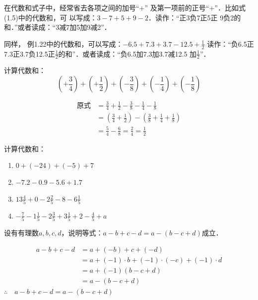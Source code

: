 在代数和式子中，经常省去各项之间的加号“$+$”
及第一项前的正号“$+$”．比如式(1.5)中的代数和，可
以写成：$3-7+5+9-2$．读作：“正3负7正5正
9负2的和．”或者读成：“3减7加5加9减2”．

同样，
例1.22中的代数和，可以写成：$-6.5+7.3+3.7-12.5+\frac{1}{2}$
读作：“负6.5正7.3正3.7负12.5正$\frac{1}{2}$的和”．或者读成：“负6.5加7.3加3.7减12.5
加$\frac{1}{2}$”．




\begin{example}
	计算代数和：
	\[\left(+\frac{3}{4}\right)+\left(+\frac{1}{2}\right)+\left(-\frac{3}{8}\right)+\left(-\frac{1}{4}\right)+\left(-\frac{1}{8}\right)  \]   
\end{example}


\begin{solution}
	\begin{align*}
	\text{原式}&=\frac{3}{4}+\frac{1}{2}-\frac{3}{8}-\frac{1}{4}-\frac{1}{8}  \tag{简化代数和}\\
	&=\left(\frac{3}{4}+\frac{1}{2}\right)-\left(\frac{3}{8}+\frac{1}{4}+\frac{1}{8}\right)\\
	&=\frac{5}{4}-\frac{6}{8}=\frac{2}{4}=\frac{1}{2}
	\end{align*}  
\end{solution}

\begin{ex}
	计算代数和：
	\begin{enumerate}
		\item $0+(-24)+(-5)+7$
		\item $-7.2-0.9-5.6+1.7$
		\item $13\frac{4}{5}+0-2\frac{2}{5}-8-6\frac{1}{5}$
		\item $-\frac{7}{5}-1\frac{1}{5}-2\frac{3}{5}+3\frac{1}{5}+2-\frac{4}{5}+a$
	\end{enumerate} 
\end{ex}

\begin{example}
	设有有理数$a,b,c,d$，说明等式：$a-b+c-d=a-(b-c+d)$成立．
\end{example}

\begin{solution}
	\begin{align*}
	a-b+c-d&= a+(-b)+c+(-d) \tag{代数和原意}\\
	&=a+ (-1)\cdot b+(-1)\cdot (-c)+(-1)\cdot d  \tag{相反数意义}\\
	&=a+(-1)(b-c+d) \tag{分配律}\\
	&=a-(b-c+d)  \tag{相反数意义}    
	\end{align*}    
	$\therefore\quad a-b+c-d=a-(b-c+d)$
\end{solution}


